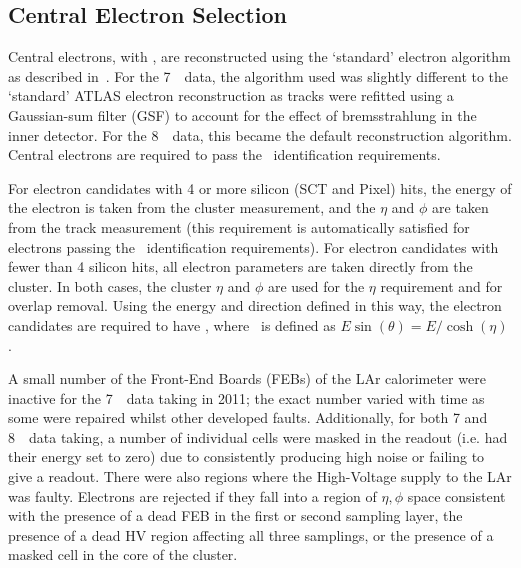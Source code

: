 \subsection{Central Electron Selection}

Central electrons, with , are reconstructed using the
`standard' electron algorithm as described in~.  For the 7~\tev\
data, the algorithm used was slightly different to the `standard' ATLAS electron
reconstruction as tracks were refitted using a Gaussian-sum filter (GSF) to
account for the effect of bremsstrahlung in the inner detector. For
the 8~\tev\ data, this became the default reconstruction algorithm. Central electrons
are required to pass the \loosePP\ identification requirements.

For electron candidates with 4 or more silicon (SCT and Pixel) hits, the energy
of the electron is taken from the cluster measurement, and the $\eta$ and $\phi$
are taken from the track measurement (this requirement is automatically
satisfied for electrons passing the \loosePP\ identification requirements). For
electron candidates with fewer than 4 silicon hits, all electron parameters are
taken directly from the cluster. In both cases, the cluster $\eta$ and $\phi$
are used for the $\eta$ requirement and for overlap removal. Using the energy
and direction defined in this way, the electron candidates are required to have
\etgt{7}, where \et\ is defined as $E\sin(\theta)=E/\cosh(\eta)$. 

A small number of the Front-End Boards (FEBs) of the LAr calorimeter were
inactive for the 7~\tev\ data taking in 2011; the exact number varied with time as some were
repaired whilst other developed faults. Additionally, for both 7 and 8~\tev\ data taking, a number of individual
cells were masked in the readout (i.e. had their energy set to zero) due to
consistently producing high noise or failing to give a readout. There were also
regions where the High-Voltage supply to the LAr was faulty. Electrons are
rejected if they fall into a region of $\eta, \phi$ space consistent with the
presence of a dead FEB in the first or second sampling layer, the
presence of a dead HV region affecting all three samplings, or the presence of a
masked cell in the core of the cluster.

